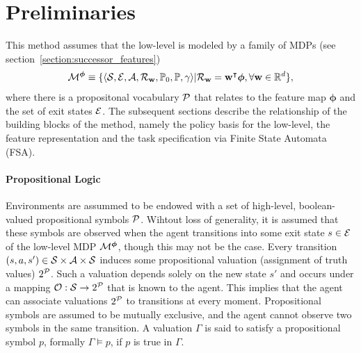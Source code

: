 \section{Preliminaries}
This method assumes that the low-level is modeled by a family of MDPs (see section~\ref{section:successor_features})
\begin{equation}
  \mathcal{M}^{\boldsymbol{\phi}}\equiv\{\langle\mathcal{S},\mathcal{E},\mathcal{A},\mathcal{R}_{\mathbf{w}},\mathbb{P}_0, \mathbb{P},\gamma\rangle \lvert \mathcal{R}_{\mathbf{w}} = \mathbf{w}^\intercal \boldsymbol{\phi}, \forall\mathbf{w}\in\mathbb{R}^d\},
\end{equation}
where there is a propositonal vocabulary $\mathcal{P}$ that relates to the feature map $\boldsymbol{\phi}$ and the set of exit states $\mathcal{E}$. The subsequent sections describe the relationship of the building blocks of the method, namely the policy basis for the low-level, the feature representation and the task specification via Finite State Automata (FSA).

\paragraph{Propositional Logic} Environments are assummed to be endowed with a set of high-level, boolean-valued propositional symbols $\mathcal{P}$. Wihtout loss of generality, it is assumed that these symbols are observed when the agent transitions into some exit state $s\in\mathcal{E}$ of the low-level MDP $\mathcal{M}^{\boldsymbol{\phi}}$, though this may not be the case. Every transition $(s, a, s')\in\mathcal{S}\times\mathcal{A}\times\mathcal{S}$ induces some propositional valuation (assignment of truth values) $2^{\mathcal{P}}$. Such a valuation depends solely on the new state $s'$ and occurs under a mapping ${\mathcal{O}:\mathcal{S}\rightarrow2^{\mathcal{P}}}$ that is known to the agent. This implies that the agent can associate valuations $2^{\mathcal{P}}$ to transitions at every moment. Propositional symbols are assumed to be mutually exclusive, and the agent cannot observe two symbols in the same transition. A valuation $\Gamma$ is said to satisfy a propositional symbol $p$, formally $\Gamma\vDash p$, if $p$ is true in $\Gamma$. 

